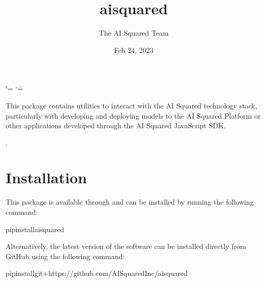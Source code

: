 \documentclass[letterpaper,10pt,english]{sphinxmanual}
\title{aisquared}
\date{Feb 24, 2023}
\author{The AI Squared Team}
\let\sphinxpxdimen\pdfpxdimen\else\newdimen\sphinxpxdimen
\begin{document}
\ifdefined\shorthandoff
  \ifnum\catcode`\=\string=\active\shorthandoff{=}\fi
  \ifnum\catcode`\"=\active{}\fi
\fi

\pagestyle{empty}
\sphinxmaketitle
\pagestyle{plain}
\sphinxtableofcontents
\pagestyle{normal}
\label{\detokenize{index::doc}}
\noindent{\hspace*{\fill}\sphinxincludegraphics[width=400\sphinxpxdimen]{{aisquared}.png}\hspace*{\fill}}

\begin{DUlineblock}{0em}
\item[] 
\item[] 
\end{DUlineblock}



\sphinxAtStartPar
This package contains utilities to interact with the AI Squared technology stack, particularly with developing and deploying models to the AI Squared Platform or other applications developed through the AI Squared JavaScript SDK.

\sphinxAtStartPar
{} 

\sphinxAtStartPar
{}.

\begin{DUlineblock}{0em}
\item[] 
\end{DUlineblock}


\chapter{Installation}
\label{\detokenize{index:installation}}
\sphinxAtStartPar
This package is available through  and can be installed by running the following command:

\begin{sphinxVerbatim}[commandchars=\\\{\}]
pipinstallaisquared
\end{sphinxVerbatim}

\sphinxAtStartPar
Alternatively, the latest version of the software can be installed directly from GitHub using the following command:

\begin{sphinxVerbatim}[commandchars=\\\{\}]
pipinstallgit+https://github.com/AISquaredInc/aisquared
\end{sphinxVerbatim}
\end{document}
